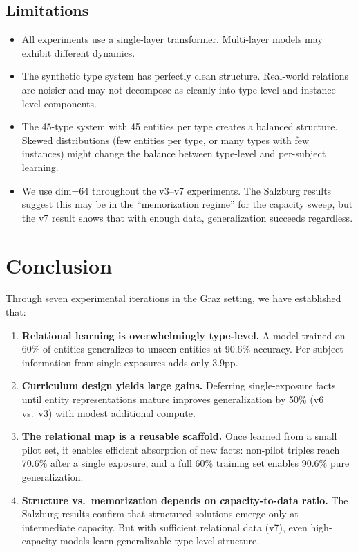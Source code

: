 \documentclass[11pt]{article}
\begin{document}
\subsection{Limitations}

\begin{itemize}
\item All experiments use a single-layer transformer.  Multi-layer models may exhibit
  different dynamics.
\item The synthetic type system has perfectly clean structure.  Real-world relations
  are noisier and may not decompose as cleanly into type-level and instance-level
  components.
\item The 45-type system with 45 entities per type creates a balanced structure.
  Skewed distributions (few entities per type, or many types with few instances)
  might change the balance between type-level and per-subject learning.
\item We use dim=64 throughout the v3--v7 experiments.  The Salzburg results suggest
  this may be in the ``memorization regime'' for the capacity sweep, but the v7
  result shows that with enough data, generalization succeeds regardless.
\end{itemize}

\section{Conclusion}
\label{sec:conclusion}

Through seven experimental iterations in the Graz setting, we have established that:

\begin{enumerate}
\item \textbf{Relational learning is overwhelmingly type-level.}  A model trained on
  60\% of entities generalizes to unseen entities at 90.6\% accuracy.  Per-subject
  information from single exposures adds only 3.9pp.

\item \textbf{Curriculum design yields large gains.}  Deferring single-exposure facts
  until entity representations mature improves generalization by 50\% (v6 vs.\ v3)
  with modest additional compute.

\item \textbf{The relational map is a reusable scaffold.}  Once learned from a small
  pilot set, it enables efficient absorption of new facts: non-pilot triples reach
  70.6\% after a single exposure, and a full 60\% training set enables 90.6\%
  pure generalization.

\item \textbf{Structure vs.\ memorization depends on capacity-to-data ratio.}  The
  Salzburg results confirm that structured solutions emerge only at intermediate
  capacity.  But with sufficient relational data (v7), even high-capacity models
  learn generalizable type-level structure.
\end{enumerate}
\end{document}
